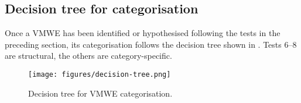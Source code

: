 \documentclass[output=paper,
modfonts,
]{langscibook}
\begin{document}
\subsection{Decision tree for categorisation}
\label{sec:decision-tree}
%
Once a VMWE has been identified or hypothesised following the tests in the preceding section, its categorisation follows the decision tree shown in . Tests 6--8 are structural, the others are category-specific.

\begin{figure}
\texttt{[image: figures/decision-tree.png]}
\caption{Decision tree for VMWE categorisation.}
\label{fig:decision-tree}
\end{figure}

\end{document}
